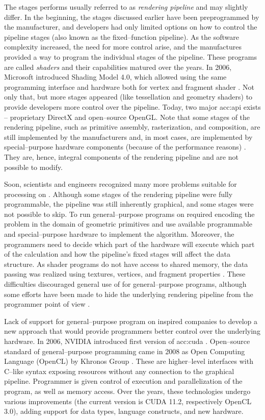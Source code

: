 The stages \gpu performs usually referred to as \emph{rendering pipeline} and may slightly differ. In the beginning, the stages discussed earlier have been preprogrammed by the manufacturer, and developers had only limited options on how to control the pipeline stages (also known as the fixed--function pipeline). As the software complexity increased, the need for more control arise, and the manufactures provided a way to program the individual stages of the pipeline. These programs are called \emph{shaders} and their capabilities matured over the years. In 2006, Microsoft introduced Shading Model 4.0, which allowed using the same programming interface and hardware both for vertex and fragment shader \citep{DirectX10}. Not only that, but more stages appeared (like tessellation and geometry shaders) to provide developers more control over the pipeline. Today, two major \acrfull{acc:api} exists -- proprietary  DirectX and open--source OpenGL. Note that some stages of the rendering pipeline, such as primitive assembly, rasterization, and composition, are still implemented by the \gpu manufacturers and, in most cases, are implemented by special--purpose hardware components (because of the performance reasons) \citep{SoftwareRasterization}. They are, hence, integral components of the rendering pipeline and are not possible to modify.

Soon, scientists and engineers recognized many more problems suitable for processing on \gpu. Although some stages of the rendering pipeline were fully programmable, the pipeline was still inherently graphical, and some stages were not possible to skip. To run general--purpose programs on \gpu required encoding the problem in the domain of geometric primitives and use available programmable and special--purpose hardware to implement the algorithm. Moreover, the programmers need to decide which part of the hardware will execute which part of the calculation and how the pipeline's fixed stages will affect the data structure. As shader programs do not have access to shared memory, the data passing was realized using textures, vertices, and fragment properties \citep{GPUComputingOwens}. These difficulties discouraged general use of \gpu for general--purpose programs, although some efforts have been made to hide the underlying rendering pipeline from the programmer point of view \citep{BrookGPU}.

Lack of support for general--purpose program on \gpu inspired companies to develop a new approach that would provide programmers better control over the underlying hardware. In 2006, NVIDIA introduced first version of \acrfull{acc:cuda} \citep{CUDAwiki}. Open--source standard of general--purpose \gpu programming came in 2008 as Open Computing Language (OpenCL) by Khronos Group \citep{OpenCLRelease}. These are higher--level interfaces with C--like syntax exposing \gpu resources without any connection to the graphical pipeline. Programmer is given control of execution and parallelization of the program, as well as memory access. Over the years, these technologies undergo various improvements (the current version is CUDA 11.2, respectively OpenCL 3.0), adding support for data types, language constructs, and new hardware.

